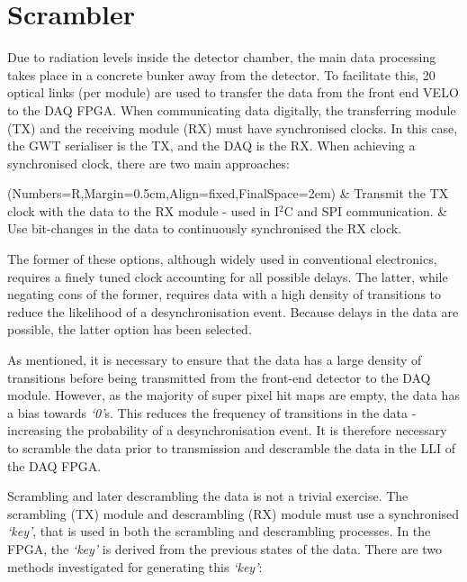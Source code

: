 \section{Scrambler}
\label{sec:scrambling_algorithms}

	Due to radiation levels inside the detector chamber, the main data processing takes place in a concrete bunker away from the detector.
	To facilitate this, 20 optical links (per module) are used to transfer the data from the front end VELO to the DAQ FPGA.
	When communicating data digitally, the transferring module (TX) and the receiving module (RX) must have synchronised clocks.
	In this case, the GWT serialiser is the TX, and the DAQ is the RX.
	When achieving a synchronised clock, there are two main approaches:

	\begin{easylist}
		\ListProperties(Numbers=R,Margin=0.5cm,Align=fixed,FinalSpace=2em)
		& Transmit the TX clock with the data to the RX module - used in I$^2$C and SPI communication.
		& Use bit-changes in the data to continuously synchronised the RX clock.
	\end{easylist}

	The former of these options, although widely used in conventional electronics, requires a finely tuned clock accounting for all possible delays.
	The latter, while negating cons of the former, requires data with a high density of transitions to reduce the likelihood of a desynchronisation event.
	Because delays in the data are possible, the latter option has been selected.

	As mentioned, it is necessary to ensure that the data has a large density of transitions before being transmitted from the front-end detector to the DAQ module.
	However, as the majority of super pixel hit maps are empty, the data has a bias towards \textit{`0'}s.
	This reduces the frequency of transitions in the data - increasing the probability of a desynchronisation event.
	It is therefore necessary to scramble the data prior to transmission and descramble the data in the LLI of the DAQ FPGA.
	\par
	Scrambling and later descrambling the data is not a trivial exercise.
	The scrambling (TX) module and descrambling (RX) module must use a synchronised \textit{`key'}, that is used in both the scrambling and descrambling processes.
	In the FPGA, the \textit{`key'} is derived from the previous states of the data.
	There are two methods investigated for generating this \textit{`key'}:

